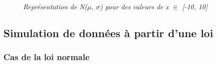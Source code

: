 \documentclass{article}      %
\begin{document}
\begin{figure}[H]
    \centering
    \\
    \textit{Représentation de N($\mu$, $\sigma$) pour des valeurs de x $\in$ [-10, 10]}
\end{figure}

\subsection{Simulation de données à partir d’une loi}

\subsubsection{Cas de la loi normale}
\end{document}
